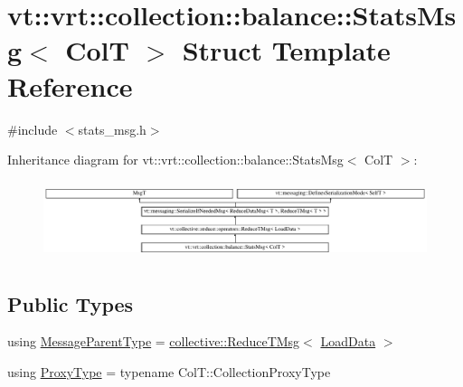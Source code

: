 \hypertarget{structvt_1_1vrt_1_1collection_1_1balance_1_1_stats_msg}{}\section{vt\+:\+:vrt\+:\+:collection\+:\+:balance\+:\+:Stats\+Msg$<$ ColT $>$ Struct Template Reference}
\label{structvt_1_1vrt_1_1collection_1_1balance_1_1_stats_msg}


{\ttfamily \#include $<$stats\+\_\+msg.\+h$>$}

Inheritance diagram for vt\+:\+:vrt\+:\+:collection\+:\+:balance\+:\+:Stats\+Msg$<$ ColT $>$\+:\begin{figure}[H]
\begin{center}
\leavevmode
\includegraphics[height=2.299795cm]{structvt_1_1vrt_1_1collection_1_1balance_1_1_stats_msg}
\end{center}
\end{figure}
\subsection*{Public Types}
\begin{DoxyCompactItemize}
\item 
using \hyperlink{structvt_1_1vrt_1_1collection_1_1balance_1_1_stats_msg_aebee389cbc279025a82f4542c9413724}{Message\+Parent\+Type} = \hyperlink{namespacevt_1_1collective_a28b82d5d48c9bc6e4fd738fcbf9e0f62}{collective\+::\+Reduce\+T\+Msg}$<$ \hyperlink{structvt_1_1vrt_1_1collection_1_1balance_1_1_load_data}{Load\+Data} $>$
\item 
using \hyperlink{structvt_1_1vrt_1_1collection_1_1balance_1_1_stats_msg_a6f88a58947e0a02b3f7dcfec8b91b5fd}{Proxy\+Type} = typename Col\+T\+::\+Collection\+Proxy\+Type
\end{DoxyCompactItemize}
